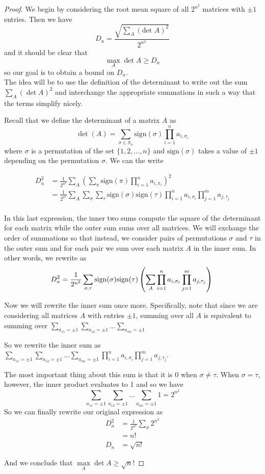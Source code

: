 \documentclass{article}
\theoremstyle{definition}
\begin{document}
\begin{proof}
We begin by considering the root mean square of all $2^{n^2}$ matrices with $\pm 1$ entries. Then we have
$$ D_n = \frac{\sqrt{\sum_A (\text{det } A)^2}}{2^{n^2}}$$
and it should be clear that
$$ \underset{A}{\max} \det A \geq D_n$$
so our goal is to obtain a bound on $D_n$.\\

The idea will be to use the definition of the determinant to write out the sum $\sum_A (\det A)^2$ and interchange the appropriate summations in such a way that the terms simplify nicely.

Recall that we define the determinant of a matrix $A$ as
$$ \det(A) = \sum_{\sigma \in S_n} \text{sign}(\sigma) \prod_{i=1}^n a_{i, \sigma_i}$$
where $\sigma$ is a permutation of the set $\{1,2,\ldots,n\}$ and $\text{sign}(\sigma)$ takes a value of $\pm 1$ depending on the permutation $\sigma$. We can the write

\begin{align*}
  D_n^2 &= \frac{1}{2^{n^2}} \sum_A \left(\sum_{\pi} \text{sign}(\pi) \prod_{i=1}^n a_{i,\pi_i}\right)^2\\
  &= \frac{1}{2^{n^2}} \sum_A \sum_{\sigma} \sum_{\tau} \text{sign}(\sigma) \text{sign}(\tau) \prod_{i=1}^n a_{i,\sigma_i} \prod_{j=1}^m a_{j,\tau_j}\\
\end{align*}

In this last expression, the inner two sums compute the square of the determinant for each matrix while the outer sum sums over all matrices. We will exchange the order of summations so that instead, we consider pairs of permutations $\sigma$ and $\tau$ in the outer sum and for each pair we sum over each matrix $A$ in the inner sum. In other words, we rewrite as
$$
  D_n^2 = \frac{1}{2^{n^2}} \sum_{\sigma, \tau}\text{sign}(\sigma) \text{sign}(\tau) \left(\sum_A \prod_{i=1}^n a_{i,\sigma_i} \prod_{j=1}^m a_{j,\tau_j} \right)\\
  $$

  Now we will rewrite the inner sum once more. Specifically, note that since we are considering all matrices $A$ with entries $\pm 1$, summing over all $A$ is equivalent to summing over $\sum_{a_{11} = \pm 1} \sum_{a_{12} = \pm 1} \dots \sum_{a_{nn} = \pm 1}$

  So we rewrite the inner sum as $\sum_{a_{11} = \pm 1} \sum_{a_{12} = \pm 1} \dots \sum_{a_{nn} = \pm 1} \prod_{i=1}^n a_{i,\sigma_i} \prod_{j=1}^m a_{j,\tau_j}$.

  The most important thing about this sum is that it is 0 when $\sigma \neq \tau$. When $\sigma = \tau$, however, the inner product evaluates to 1 and so we have
  $$ \sum_{a_{11} = \pm 1} \sum_{a_{12} = \pm 1} \dots \sum_{a_{nn} = \pm 1} 1 = 2^{n^2}$$
  So we can finally rewrite our original expression as
  \begin{align*}
  D_n^2 &= \frac{1}{2^{n^2}} \sum_{\sigma} 2^{n^2} \\
  &= n!\\
  D_n &= \sqrt{n!}
  \end{align*}

  And we conclude that $\underset{A}{\max} \det A \geq \sqrt n!$
\end{proof}
\end{document}
